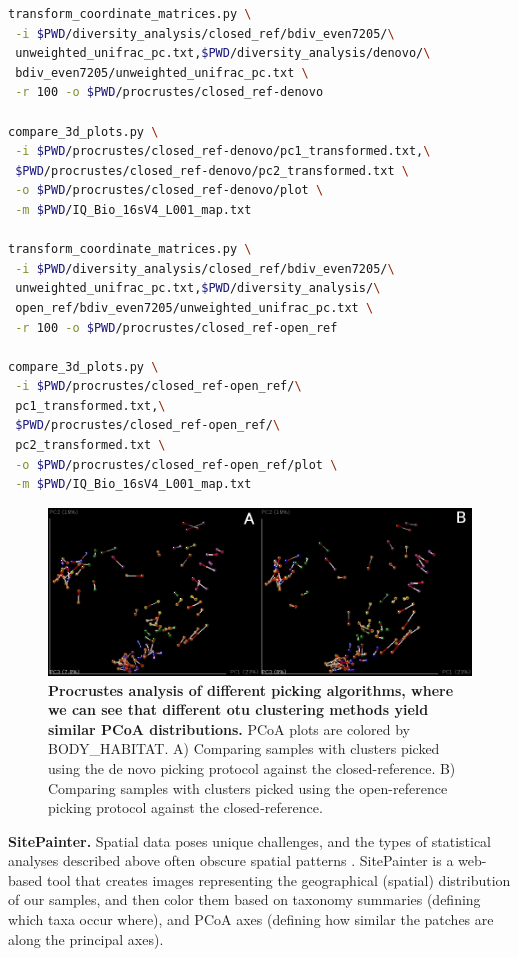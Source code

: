 \begin{lstlisting}[language=bash]
transform_coordinate_matrices.py \
 -i $PWD/diversity_analysis/closed_ref/bdiv_even7205/\
 unweighted_unifrac_pc.txt,$PWD/diversity_analysis/denovo/\
 bdiv_even7205/unweighted_unifrac_pc.txt \
 -r 100 -o $PWD/procrustes/closed_ref-denovo

compare_3d_plots.py \
 -i $PWD/procrustes/closed_ref-denovo/pc1_transformed.txt,\
 $PWD/procrustes/closed_ref-denovo/pc2_transformed.txt \
 -o $PWD/procrustes/closed_ref-denovo/plot \
 -m $PWD/IQ_Bio_16sV4_L001_map.txt

transform_coordinate_matrices.py \
 -i $PWD/diversity_analysis/closed_ref/bdiv_even7205/\
 unweighted_unifrac_pc.txt,$PWD/diversity_analysis/\
 open_ref/bdiv_even7205/unweighted_unifrac_pc.txt \
 -r 100 -o $PWD/procrustes/closed_ref-open_ref

compare_3d_plots.py \
 -i $PWD/procrustes/closed_ref-open_ref/\
 pc1_transformed.txt,\
 $PWD/procrustes/closed_ref-open_ref/\
 pc2_transformed.txt \
 -o $PWD/procrustes/closed_ref-open_ref/plot \
 -m $PWD/IQ_Bio_16sV4_L001_map.txt
\end{lstlisting}

\begin{figure}[htbp]
\includegraphics[width=\columnwidth]{chapter_book_figures/Figure_18.jpg}
\caption[Procrustes analysis of different picking algorithms, where we can see that different \gls{otu} clustering methods yield similar PCoA distributions]{\textbf{Procrustes analysis of different picking algorithms, where we can see that different \gls{otu} clustering methods yield similar PCoA distributions.}
PCoA plots are colored by BODY\_HABITAT. A) Comparing samples with clusters picked
using the de novo picking protocol against the closed-reference. B) Comparing
samples with clusters picked using the open-reference picking protocol against the closed-reference.}
\label{bfigure18}
\end{figure}

\textbf{SitePainter.} Spatial data poses unique challenges, and the types of statistical analyses
described above often obscure spatial patterns \cite{Gevers2012, Hewitt2013}.
SitePainter \cite{Gonzalez2012SitePainter} is a web-based tool that creates images representing the
geographical (spatial) distribution of our samples, and then color them based on taxonomy summaries
(defining which taxa occur where), and PCoA axes (defining how similar the patches are along the principal axes).

